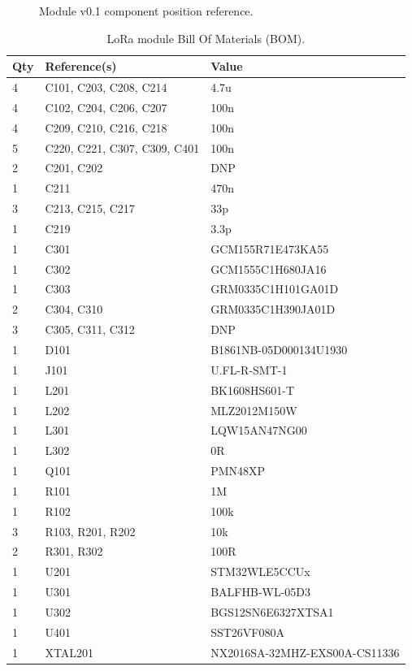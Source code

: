 \begin{figure}
    
    \caption{\label{board:v0.1-components}Module v0.1 component position reference.}
\end{figure}

\begin{table}
\begin{center}
\caption{\label{table:module-bom}LoRa module Bill Of Materials (BOM).}
\begin{tabular}{|l|l|l|} \hline
    \textbf{Qty} &	\textbf{Reference(s)} &	\textbf{Value} \\ \hline
    4   & C101, C203, C208, C214 & 4.7u \\ \hline
    4  & C102, C204, C206, C207 & 100n \\ \hline
    4  & C209, C210, C216, C218 & 100n \\ \hline
    5  & C220, C221, C307, C309, C401 & 100n \\ \hline
    2   & C201, C202 & DNP \\ \hline
    1   & C211 & 470n \\ \hline
    3   & C213, C215, C217 &	33p \\ \hline
    1   & C219	& 3.3p \\ \hline
    1   & C301	& GCM155R71E473KA55 \\ \hline
    1   & C302	& GCM1555C1H680JA16 \\ \hline
    1   & C303	& GRM0335C1H101GA01D \\ \hline
    2   & C304, C310	& GRM0335C1H390JA01D \\ \hline
    3   & C305, C311, C312	& DNP \\ \hline
    1   & D101	& B1861NB-05D000134U1930 \\ \hline
    1   & J101	& U.FL-R-SMT-1 \\ \hline
    1   & L201	& BK1608HS601-T \\ \hline
    1   & L202	& MLZ2012M150W \\ \hline
    1   & L301	& LQW15AN47NG00 \\ \hline
    1   & L302	& 0R \\ \hline
    1   & Q101	& PMN48XP \\ \hline
    1   & R101	& 1M \\ \hline
    1   & R102	& 100k \\ \hline
    3   & R103, R201, R202	& 10k \\ \hline
    2   & R301, R302	& 100R \\ \hline
    1   & U201	& STM32WLE5CCUx \\ \hline
    1   & U301	& BALFHB-WL-05D3 \\ \hline
    1   & U302	& BGS12SN6E6327XTSA1 \\ \hline
    1   & U401	& SST26VF080A \\ \hline
    1   & XTAL201 &	NX2016SA-32MHZ-EXS00A-CS11336 \\ \hline
\end{tabular}
\end{center}
\end{table}
